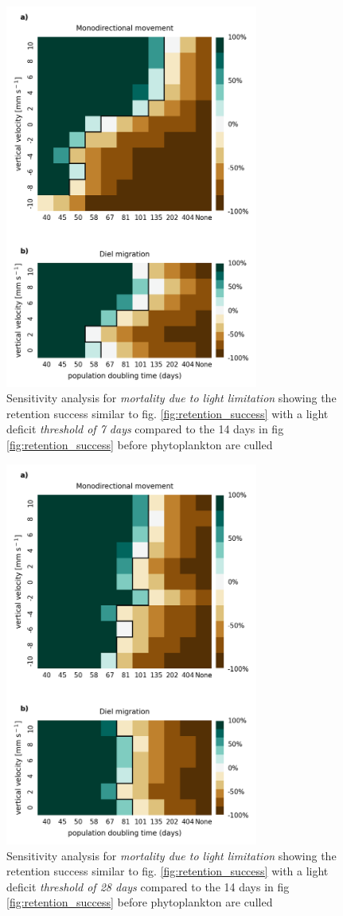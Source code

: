 \documentclass[npg, manuscript]{copernicus}
\begin{document}
\appendixfigures 
\begin{figure}
    \includegraphics[width=8.3cm]{retention_success_sa_29.png}
    \caption[]{
        Sensitivity analysis for \textit{mortality due to light limitation} showing the retention success similar to fig. \ref{fig:retention_success} with a light deficit \textit{threshold of 7 days} compared to the 14 days in fig \ref{fig:retention_success} before phytoplankton are culled
    }
    \label{fig:retention_success_low_light}
\end{figure}
\clearpage
\begin{figure}
    \includegraphics[width=8.3cm]{retention_success_sa_28.png}
    \caption[]{
        Sensitivity analysis for \textit{mortality due to light limitation} showing the retention success similar to fig. \ref{fig:retention_success} with a light deficit \textit{threshold of 28 days} compared to the 14 days in fig \ref{fig:retention_success} before phytoplankton are culled
    }
    \label{fig:retention_success_high_light}
\end{figure}
\end{document}

